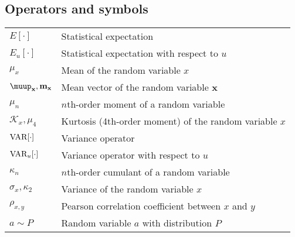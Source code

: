 \documentclass{article}
\begin{document}
\subsection{Operators and symbols}
\begin{xltabular}{\textwidth}{XX}
    \(E\left[ \cdot \right]\) & Statistical expectation\\
    \(E_u\left[ \cdot \right]\) & Statistical expectation with respect to \(u\)\\
    \(\mu_x\) & Mean of the random variable \(x\) \\
    \(\boldsymbol{\muup}_\mathbf{x}, \mathbf{m}_\mathbf{x}\) & Mean vector of the random variable \(\mathbf{x}\)\\
    \(\mu_n\) & \(n\)th-order moment of a random variable \\
    \(\mathcal{K}_x, \mu_4\) & Kurtosis (4th-order moment) of the random variable \(x\)\\
    \(\textnormal{VAR}[\cdot]\) & Variance operator\\
    \(\textnormal{VAR}_u[\cdot]\) & Variance operator with respect to \(u\)\\
    \(\kappa_n\) & \(n\)th-order cumulant of a random variable \\
    \(\sigma_x, \kappa_2\) & Variance of the random variable \(x\)\\
    \(\rho_{x,y}\) & Pearson correlation coefficient between \(x\) and \(y\)\\
    \(a\sim P\) & Random variable \(a\) with distribution \(P\) \\
\end{xltabular}
\end{document}
